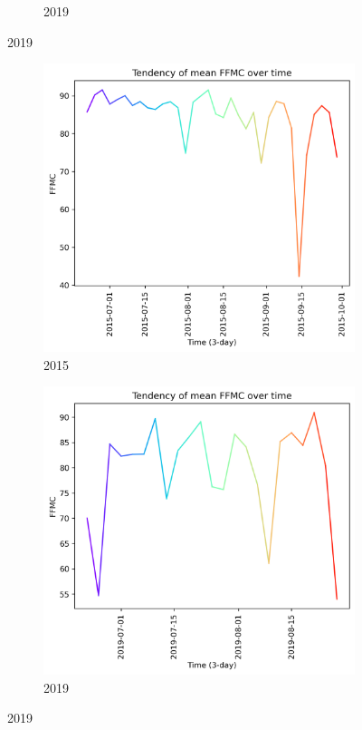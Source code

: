 \begin{figure}[h]
\begin{subfigure}{0.49\textwidth}
		\caption{2019}
		\label{fig:mean_tendency_fwi_2019}
	\end{subfigure}
	\label{fig:mean_tendency_fwi}
\end{figure}

\begin{figure}[h]
	\caption{FFMC mean tendency graph}
	\centering
	\begin{subfigure}{0.49\textwidth}
		\centering
		\includegraphics[width=\textwidth]{graphs/all_time/2015_tendency_graph_FFMC.png}
		\caption{2015}
		\label{fig:mean_tendency_ffmc_2015}
	\end{subfigure}
	\hfill
	\begin{subfigure}{0.49\textwidth}
		\centering
		\includegraphics[width=\textwidth]{graphs/all_time/2019_tendency_graph_FFMC.png}
		\caption{2019}
		\label{fig:mean_tendency_ffmc_2019}
	\end{subfigure}
	\label{fig:mean_tendency_ffmc}
\end{figure}

